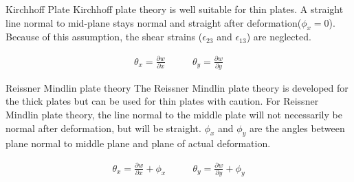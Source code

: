 \documentclass[9pt]{beamer}
\begin{document}
\begin{frame}
\begin{block}{Kirchhoff Plate}
 Kirchhoff plate theory is well suitable for thin plates. A straight line normal to mid-plane stays normal and straight after deformation($\phi_x=0$).  Because of this assumption, the shear strains ($\epsilon_{23}$ and $ \epsilon_{13}$)  are neglected.


\begin{align*}
\theta_x  = \frac{\partial w }{\partial x}  \quad & \quad
\theta_y  = \frac{\partial w }{\partial y} 
\end{align*}

\end{block}

\begin{block}{Reissner Mindlin plate theory}
The Reissner Mindlin plate theory is developed for the thick plates but can be used for thin plates with caution.  For Reissner Mindlin plate theory, the line normal to the middle plate will not necessarily be normal after deformation, but will be straight. $\phi_x$ and $\phi_y$ are the angles between plane normal to middle plane and plane of actual deformation.  

\begin{align*}\label{eq:thetaRM}
\theta_x  = \frac{\partial w }{\partial x} + \phi_x \quad & \quad
\theta_y  = \frac{\partial w }{\partial y} + \phi_y
\end{align*}
\end{block}
\end{frame}
\end{document}

